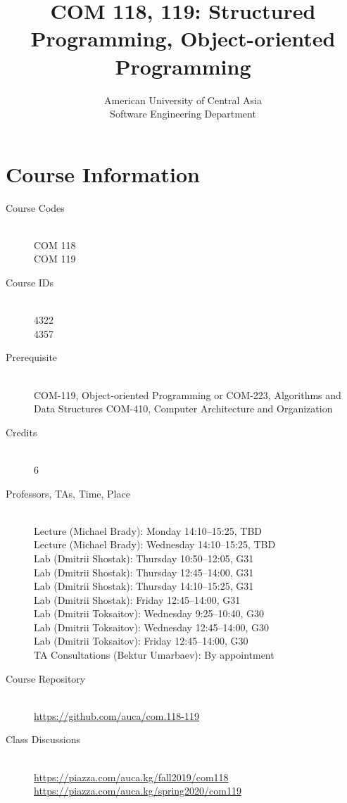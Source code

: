 \documentclass[12pt,a4paper,oneside]{article}
\begin{document}
    \title{COM 118, 119: Structured Programming, Object-oriented Programming}
    \author{
        American University of Central Asia\\
        Software Engineering Department
    }
    \date{}
    \maketitle

    \section{Course Information}

        \begin{description}
            \item[Course Codes]\hfill\\
                COM 118\\
                COM 119
            \item[Course IDs]\hfill\\
                4322\\
                4357
            \item[Prerequisite]\hfill\\
                COM-119, Object-oriented Programming
                or
                COM-223, Algorithms and Data Structures
                COM-410, Computer Architecture and Organization
            \item[Credits]\hfill\\
                6
            \item[Professors, TAs, Time, Place]\hfill\\
                Lecture (Michael Brady): Monday 14:10--15:25, TBD\\
                Lecture (Michael Brady): Wednesday 14:10--15:25, TBD\\
                Lab (Dmitrii Shostak): Thursday 10:50--12:05, G31\\
                Lab (Dmitrii Shostak): Thursday 12:45--14:00, G31\\
                Lab (Dmitrii Shostak): Thursday 14:10--15:25, G31\\
                Lab (Dmitrii Shostak): Friday 12:45--14:00, G31\\
                Lab (Dmitrii Toksaitov): Wednesday 9:25--10:40, G30\\
                Lab (Dmitrii Toksaitov): Wednesday 12:45--14:00, G30\\
                Lab (Dmitrii Toksaitov): Friday 12:45--14:00, G30\\
                TA Consultations (Bektur Umarbaev): By appointment
            \item[Course Repository]\hfill\\
                \url{https://github.com/auca/com.118-119}
			\item[Class Discussions]\hfill\\
                \url{https://piazza.com/auca.kg/fall2019/com118}\\
                \url{https://piazza.com/auca.kg/spring2020/com119}
        \end{description}
\end{document}

